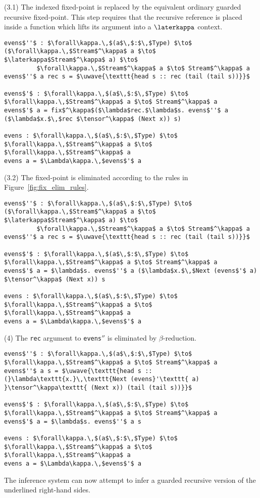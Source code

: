(3.1) The indexed fixed-point is replaced by the equivalent ordinary guarded
recursive fixed-point. This step requires that the recursive reference is
placed inside a function which lifts its argument into a $\laterkappa$ context.
\begin{lstlisting}[mathescape]
evens$''$ : $\forall\kappa.\,$(a$\,$:$\,$Type) $\to$ ($\forall\kappa.\,$Stream$^\kappa$ a $\to$ $\laterkappa$Stream$^\kappa$ a) $\to$ 
         $\forall\kappa.\,$Stream$^\kappa$ a $\to$ Stream$^\kappa$ a
evens$''$ a rec s = $\uwave{\texttt{head s :: rec (tail (tail s))}}$

evens$'$ : $\forall\kappa.\,$(a$\,$:$\,$Type) $\to$ $\forall\kappa.\,$Stream$^\kappa$ a $\to$ Stream$^\kappa$ a
evens$'$ a = fix$^\kappa$($\lambda$rec.$\lambda$s. evens$''$ a ($\lambda$x.$\,$rec $\tensor^\kappa$ (Next x)) s)

evens : $\forall\kappa.\,$(a$\,$:$\,$Type) $\to$ $\forall\kappa.\,$Stream$^\kappa$ a $\to$ $\forall\kappa.\,$Stream$^\kappa$ a
evens a = $\Lambda\kappa.\,$evens$'$ a
\end{lstlisting}
(3.2) The fixed-point is eliminated according to the rules in Figure~\ref{fig:fix_elim_rules}.
\begin{lstlisting}[mathescape]
evens$''$ : $\forall\kappa.\,$(a$\,$:$\,$Type) $\to$ ($\forall\kappa.\,$Stream$^\kappa$ a $\to$ $\laterkappa$Stream$^\kappa$ a) $\to$ 
         $\forall\kappa.\,$Stream$^\kappa$ a $\to$ Stream$^\kappa$ a
evens$''$ a rec s = $\uwave{\texttt{head s :: rec (tail (tail s))}}$

evens$'$ : $\forall\kappa.\,$(a$\,$:$\,$Type) $\to$ $\forall\kappa.\,$Stream$^\kappa$ a $\to$ Stream$^\kappa$ a
evens$'$ a = $\lambda$s. evens$''$ a ($\lambda$x.$\,$Next (evens$'$ a) $\tensor^\kappa$ (Next x)) s

evens : $\forall\kappa.\,$(a$\,$:$\,$Type) $\to$ $\forall\kappa.\,$Stream$^\kappa$ a $\to$ $\forall\kappa.\,$Stream$^\kappa$ a
evens a = $\Lambda\kappa.\,$evens$'$ a
\end{lstlisting}
(4) The \texttt{rec} argument to \texttt{evens$''$} is eliminated by $\beta$-reduction.
\begin{lstlisting}[mathescape]
evens$''$ : $\forall\kappa.\,$(a$\,$:$\,$Type) $\to$ $\forall\kappa.\,$Stream$^\kappa$ a $\to$ Stream$^\kappa$ a
evens$''$ a s = $\uwave{\texttt{head s :: (}\lambda\texttt{x.}\,\texttt{Next (evens}'\texttt{ a) }\tensor^\kappa\texttt{ (Next x)) (tail (tail s))}}$

evens$'$ : $\forall\kappa.\,$(a$\,$:$\,$Type) $\to$ $\forall\kappa.\,$Stream$^\kappa$ a $\to$ Stream$^\kappa$ a
evens$'$ a = $\lambda$s. evens$''$ a s

evens : $\forall\kappa.\,$(a$\,$:$\,$Type) $\to$ $\forall\kappa.\,$Stream$^\kappa$ a $\to$ $\forall\kappa.\,$Stream$^\kappa$ a
evens a = $\Lambda\kappa.\,$evens$'$ a
\end{lstlisting}
The inference system can now attempt to infer a guarded recursive version of the
underlined right-hand sides.

